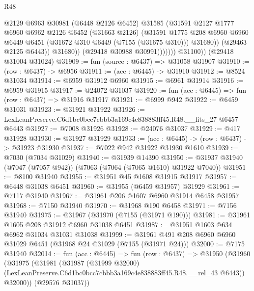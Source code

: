 \begin{lexlean}{R48}
\begin{coremodule}
                          @2129
                          @6963
                          @30981
                          (@6448 @2126 @6452)
                          @31585
                          (@31591
                            @2127
                            @1777
                            @6960
                            @6962
                            @2126
                            @6452
                            (@31663 @2126)
                            (@31591
                              @1775
                              @208
                              @6960
                              @6960
                              @6449
                              @6451
                              (@31672 @310 @6449 (@7155 (@31675 @310)))
                              @31680))
                          (@29463 @2125 @6443))
                        @31680))
                    (@29418 @30988 @30991)))))))
        @31100))
    (@29418 @31004 @31024)
@31909 := fun (source : @6437) => @31058 @31907
@31910 := (row : @6437) -> @6956
@31911 := (acc : @6445) -> @31910
@31912 := @8524 @31034
@31914 := @6959 @31912 @6960
@31915 := @6961 @31914
@31916 := @6959 @31915
@31917 := @24072 @31037
@31920 := fun (acc : @6445) => fun (row : @6437) => @31916 @31917
@31921 := @6999 @942
@31922 := @6459 @31031
@31923 := @31921 @31922
@31926 := LexLeanPreserve.C6d1bc0bcc7cbbb3a169c4e838883ff45.R48.__fits_27 @6457 @6443
@31927 := @7008 @31926
@31928 := @24076 @31037
@31929 := @417 @31928
@31930 := @31927 @31929
@31933 := (acc : @6445) -> (row : @6437) -> @31923 @31930
@31937 := @7022 @942 @31922 @31930 @1610
@31939 := @7030 (@7034 @31029)
@31940 := @31939 @14390
@31950 := @31937 @31940 (@7047 (@7057 @942)) (@7063 (@7064 (@7065 @1610) @31922 @7040))
@31951 := @8100 @31940
@31955 := @31951 @45 @1608 @31915 @31917
@31957 := @6448 @31038 @6451
@31960 := @31955 (@6459 @31957) @31929
@31961 := @7117 @31940
@31967 := @31961 @206 @1607 @6960 @31914 @6458 @31957
@31968 := @7150 @31940
@31970 := @31968 @190 @6458
@31971 := @7156 @31940
@31975 := @31967 (@31970 (@7155 (@31971 @190)))
@31981 := @31961 @1605 @208 @31912 @6960 @31038 @6451
@31987 := @31951 @1603 @634 @6962 @31034 @31031 @31038
@31999 := @31961 @491 @208 @6960 @6960 @31029 @6451 (@31968 @24 @31029 (@7155 (@31971 @24)))
@32000 := @7175 @31940
@32014 := fun (acc : @6445) =>
  fun (row : @6437) =>
  @31950
    (@31960
      (@31975
        (@31981
          (@31987
            (@31999 @32000)
            (LexLeanPreserve.C6d1bc0bcc7cbbb3a169c4e838883ff45.R48.__rel_43 @6443))
          @32000))
      (@29576 @31037))

\end{coremodule}
\end{lexlean}

